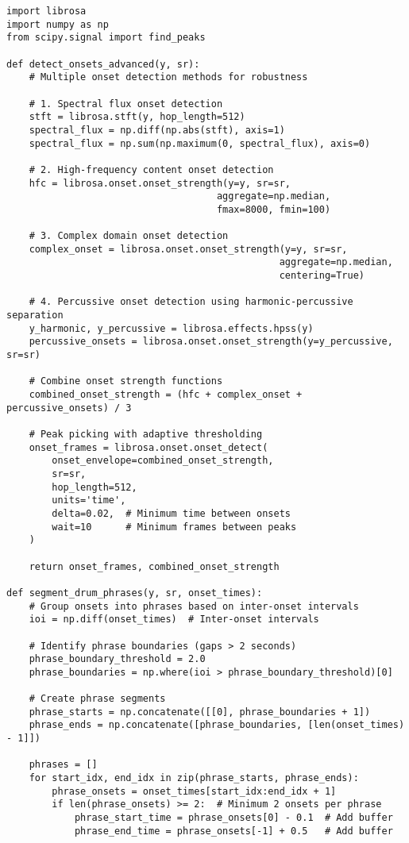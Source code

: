 \documentclass[12pt]{article}
\begin{document}
\begin{verbatim}
import librosa
import numpy as np
from scipy.signal import find_peaks

def detect_onsets_advanced(y, sr):
    # Multiple onset detection methods for robustness
    
    # 1. Spectral flux onset detection
    stft = librosa.stft(y, hop_length=512)
    spectral_flux = np.diff(np.abs(stft), axis=1)
    spectral_flux = np.sum(np.maximum(0, spectral_flux), axis=0)
    
    # 2. High-frequency content onset detection
    hfc = librosa.onset.onset_strength(y=y, sr=sr, 
                                     aggregate=np.median,
                                     fmax=8000, fmin=100)
    
    # 3. Complex domain onset detection
    complex_onset = librosa.onset.onset_strength(y=y, sr=sr,
                                                aggregate=np.median,
                                                centering=True)
    
    # 4. Percussive onset detection using harmonic-percussive separation
    y_harmonic, y_percussive = librosa.effects.hpss(y)
    percussive_onsets = librosa.onset.onset_strength(y=y_percussive, sr=sr)
    
    # Combine onset strength functions
    combined_onset_strength = (hfc + complex_onset + percussive_onsets) / 3
    
    # Peak picking with adaptive thresholding
    onset_frames = librosa.onset.onset_detect(
        onset_envelope=combined_onset_strength,
        sr=sr,
        hop_length=512,
        units='time',
        delta=0.02,  # Minimum time between onsets
        wait=10      # Minimum frames between peaks
    )
    
    return onset_frames, combined_onset_strength

def segment_drum_phrases(y, sr, onset_times):
    # Group onsets into phrases based on inter-onset intervals
    ioi = np.diff(onset_times)  # Inter-onset intervals
    
    # Identify phrase boundaries (gaps > 2 seconds)
    phrase_boundary_threshold = 2.0
    phrase_boundaries = np.where(ioi > phrase_boundary_threshold)[0]
    
    # Create phrase segments
    phrase_starts = np.concatenate([[0], phrase_boundaries + 1])
    phrase_ends = np.concatenate([phrase_boundaries, [len(onset_times) - 1]])
    
    phrases = []
    for start_idx, end_idx in zip(phrase_starts, phrase_ends):
        phrase_onsets = onset_times[start_idx:end_idx + 1]
        if len(phrase_onsets) >= 2:  # Minimum 2 onsets per phrase
            phrase_start_time = phrase_onsets[0] - 0.1  # Add buffer
            phrase_end_time = phrase_onsets[-1] + 0.5   # Add buffer
            

\end{verbatim}
\end{document}
